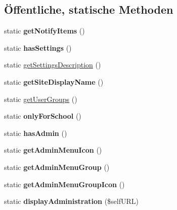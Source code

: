 \subsection*{Öffentliche, statische Methoden}
\begin{DoxyCompactItemize}
\item 
\mbox{\label{classschulbuecher_ab2d2011c65282d5a7de466a26b0bb7ab}} 
static {\bfseries get\+Notify\+Items} ()
\item 
\mbox{\label{classschulbuecher_a4e47e84e628ae83287372bb2b2f11197}} 
static {\bfseries has\+Settings} ()
\item 
static \mbox{\hyperlink{classschulbuecher_a12bf8c79ff6d2b1fe8bf6eb845f87e2d}{get\+Settings\+Description}} ()
\item 
\mbox{\label{classschulbuecher_a55320d2950ca01d043a1a684d635a669}} 
static {\bfseries get\+Site\+Display\+Name} ()
\item 
static \mbox{\hyperlink{classschulbuecher_aa28fac3077eadbd8c7aed5e26a263508}{get\+User\+Groups}} ()
\item 
\mbox{\label{classschulbuecher_a068bca25d898be074171a1e0ffa1581c}} 
static {\bfseries only\+For\+School} ()
\item 
\mbox{\label{classschulbuecher_af9c0b0b25fa05a8a13fc3713cb376674}} 
static {\bfseries has\+Admin} ()
\item 
\mbox{\label{classschulbuecher_a55749b1871971e9718baf4655be7ed3d}} 
static {\bfseries get\+Admin\+Menu\+Icon} ()
\item 
\mbox{\label{classschulbuecher_acd0f73a2bf368287c2e49b0dd754f41b}} 
static {\bfseries get\+Admin\+Menu\+Group} ()
\item 
\mbox{\label{classschulbuecher_a692e650c4e7860c117640bbc4caba2b4}} 
static {\bfseries get\+Admin\+Menu\+Group\+Icon} ()
\item 
\mbox{\label{classschulbuecher_ad806f717f5ff89f63f58e6ee54a370e4}} 
static {\bfseries display\+Administration} (\$self\+U\+RL)
\item 

\end{DoxyCompactItemize}
